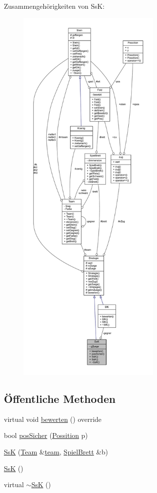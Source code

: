 Zusammengehörigkeiten von Ss\+K\+:\nopagebreak
\begin{figure}[H]
\begin{center}
\leavevmode
\includegraphics[height=550pt]{class_ss_k__coll__graph}
\end{center}
\end{figure}
\subsection*{Öffentliche Methoden}
\begin{DoxyCompactItemize}
\item 
virtual void \hyperlink{class_ss_k_aac922686e66332aae431ec05d06937a0}{bewerten} () override
\item 
bool \hyperlink{class_ss_k_a7034ff44a447cef0d24117e9a1fa9fef}{pos\+Sicher} (\hyperlink{struct_possition}{Possition} p)
\item 
\hyperlink{class_ss_k_a2cb13922fb8c0bdbad4dd36f98c0448b}{Ss\+K} (\hyperlink{class_team}{Team} \&\hyperlink{class_strategie_a4f55e74f189ec8c6df88a57119fb3def}{team}, \hyperlink{class_spiel_brett}{Spiel\+Brett} \&b)
\item 
\hyperlink{class_ss_k_a24d667d15c076686914ad331b2306f14}{Ss\+K} ()
\item 
virtual \hyperlink{class_ss_k_a3912f76c805a0d1810e0ab0c12bf49b4}{$\sim$\+Ss\+K} ()
\end{DoxyCompactItemize}
